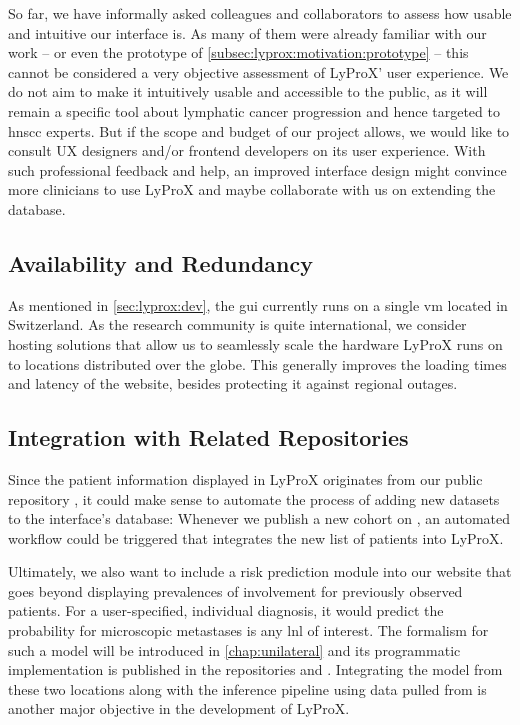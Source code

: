 \documentclass[\relativeRoot/main.tex]{subfiles}
\begin{document}
So far, we have informally asked colleagues and collaborators to assess how usable and intuitive our interface is. As many of them were already familiar with our work -- or even the prototype of \cref{subsec:lyprox:motivation:prototype} -- this cannot be considered a very objective assessment of LyProX' user experience. We do not aim to make it intuitively usable and accessible to the public, as it will remain a specific tool about lymphatic cancer progression and hence targeted to \gls{hnscc} experts. But if the scope and budget of our project allows, we would like to consult UX designers and/or frontend developers on its user experience. With such professional feedback and help, an improved interface design might convince more clinicians to use LyProX and maybe collaborate with us on extending the database.

\subsection*{Availability and Redundancy}

As mentioned in \cref{sec:lyprox:dev}, the \gls{gui} currently runs on a single \acrlong{vm} located in Switzerland. As the research community is quite international, we consider hosting solutions that allow us to seamlessly scale the hardware LyProX runs on to locations distributed over the globe. This generally improves the loading times and latency of the website, besides protecting it against regional outages.

\subsection*{Integration with Related Repositories}

Since the patient information displayed in LyProX originates from our public repository , it could make sense to automate the process of adding new datasets to the interface's database: Whenever we publish a new cohort on , an automated workflow could be triggered that integrates the new list of patients into LyProX.

Ultimately, we also want to include a risk prediction module into our website that goes beyond displaying prevalences of involvement for previously observed patients. For a user-specified, individual diagnosis, it would predict the probability for microscopic metastases is any \gls{lnl} of interest. The formalism for such a model will be introduced in \cref{chap:unilateral} and its programmatic implementation is published in the repositories  and . Integrating the model from these two locations along with the inference pipeline using data pulled from  is another major objective in the development of LyProX.
\end{document}
